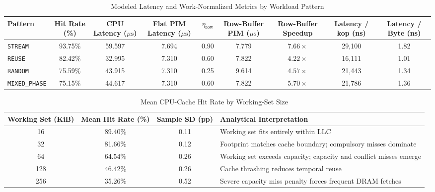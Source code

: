 \documentclass[journal,10pt,twocolumn]{IEEEtran}
\begin{document}
\begin{table}[t]
\caption{Modeled Latency and Work-Normalized Metrics by Workload Pattern}
\label{tab:workload_pattern}
\centering
\begin{tabular}{lcccccccc}
\toprule
\textbf{Pattern} & \textbf{Hit Rate (\%)} & \textbf{CPU Latency ($\mu\text{s}$)} & \textbf{Flat PIM Latency ($\mu\text{s}$)} & $\eta_{\text{row}}$ & \textbf{Row-Buffer PIM ($\mu\text{s}$)} & \textbf{Row-Buffer Speedup} & \textbf{Latency / kop (ns)} & \textbf{Latency / Byte (ns)} \\
\midrule
\texttt{STREAM} & 93.75\% & 59.597 & 7.694 & 0.90 & 7.779 & $7.66\times$ & 29,100 & 1.82 \\
\texttt{REUSE} & 82.42\% & 32.995 & 7.310 & 0.60 & 7.822 & $4.22\times$ & 16,111 & 1.01 \\
\texttt{RANDOM} & 75.59\% & 43.915 & 7.310 & 0.25 & 9.614 & $4.57\times$ & 21,443 & 1.34 \\
\texttt{MIXED\_PHASE} & 75.15\% & 44.617 & 7.310 & 0.60 & 7.822 & $5.70\times$ & 21,786 & 1.36 \\
\bottomrule
\end{tabular}
\end{table}

\begin{table}[htbp]
\caption{Mean CPU-Cache Hit Rate by Working-Set Size}
\label{tab:hitrate_scaling}
\centering
\begin{tabular}{cccl}
\toprule
\textbf{Working Set (KiB)} & \textbf{Mean Hit Rate (\%)} & \textbf{Sample SD (pp)} & \textbf{Analytical Interpretation} \\
\midrule
16 & 89.40\% & 0.11 & Working set fits entirely within LLC \\
32 & 81.66\% & 0.12 & Footprint matches cache boundary; compulsory misses dominate \\
64 & 64.54\% & 0.26 & Working set exceeds capacity; capacity and conflict misses emerge \\
128 & 46.42\% & 0.26 & Cache thrashing reduces temporal reuse \\
256 & 35.26\% & 0.52 & Severe capacity miss penalty forces frequent DRAM fetches \\
\bottomrule
\end{tabular}
\end{table}
\end{document}
